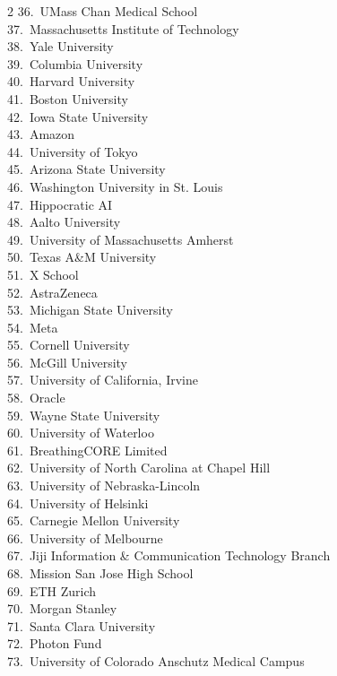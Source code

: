 {\begin{multicols}{2}
36.~UMass Chan Medical School \\
37.~Massachusetts Institute of Technology \\
38.~Yale University \\
39.~Columbia University \\
40.~Harvard University \\
41.~Boston University \\
42.~Iowa State University \\
43.~Amazon \\
44.~University of Tokyo \\
45.~Arizona State University \\
46.~Washington University in St. Louis \\
47.~Hippocratic AI \\
48.~Aalto University \\
49.~University of Massachusetts Amherst \\
50.~Texas A\&M University \\
51.~X School \\
52.~AstraZeneca \\
53.~Michigan State University \\
54.~Meta \\
55.~Cornell University \\
56.~McGill University \\
57.~University of California, Irvine \\
58.~Oracle \\
59.~Wayne State University \\
60.~University of Waterloo \\
61.~BreathingCORE Limited \\
62.~University of North Carolina at Chapel Hill \\
63.~University of Nebraska-Lincoln \\
64.~University of Helsinki \\
65.~Carnegie Mellon University \\
66.~University of Melbourne \\
67.~Jiji Information \& Communication Technology Branch \\
68.~Mission San Jose High School \\
69.~ETH Zurich \\
70.~Morgan Stanley \\
71.~Santa Clara University \\
72.~Photon Fund \\
73.~University of Colorado Anschutz Medical Campus \\

\end{multicols}}
